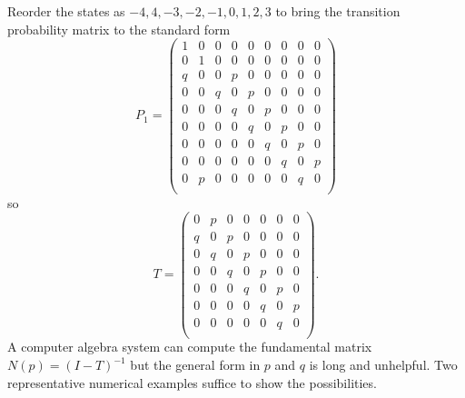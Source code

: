 \documentclass[12pt]{article}
\begin{document}
\begin{example}
    Reorder the states as \( -4, 4, -3, -2, -1, 0, 1, 2, 3 \) to bring
    the transition probability matrix to the standard form
    \[
        P_{1} =
        \begin{pmatrix}
            1 & 0 & 0 & 0 & 0 & 0 & 0 & 0 & 0 \\
            0 & 1 & 0 & 0 & 0 & 0 & 0 & 0 & 0 \\
            q & 0 & 0 & p & 0 & 0 & 0 & 0 & 0 \\
            0 & 0 & q & 0 & p & 0 & 0 & 0 & 0 \\
            0 & 0 & 0 & q & 0 & p & 0 & 0 & 0 \\
            0 & 0 & 0 & 0 & q & 0 & p & 0 & 0 \\
            0 & 0 & 0 & 0 & 0 & q & 0 & p & 0 \\
            0 & 0 & 0 & 0 & 0 & 0 & q & 0 & p \\
            0 & p & 0 & 0 & 0 & 0 & 0 & q & 0 \\
        \end{pmatrix}
    \] so
    \[
        T =
        \begin{pmatrix}
            0 & p & 0 & 0 & 0 & 0 & 0 \\
            q & 0 & p & 0 & 0 & 0 & 0 \\
            0 & q & 0 & p & 0 & 0 & 0 \\
            0 & 0 & q & 0 & p & 0 & 0 \\
            0 & 0 & 0 & q & 0 & p & 0 \\
            0 & 0 & 0 & 0 & q & 0 & p \\
            0 & 0 & 0 & 0 & 0 & q & 0 \\
        \end{pmatrix}
        .
    \] A computer algebra system can compute the fundamental matrix \( N
    (p) = (I-T)^{-1} \) but the general form in \( p \) and \( q \) is
    long and unhelpful.  Two representative numerical examples suffice
    to show the possibilities.


\end{example}
\end{document}
